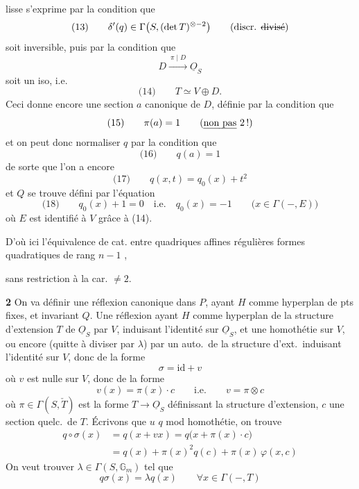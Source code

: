 \documentclass[11pt,a4paper]{article}
\begin{document}
lisse s'exprime par la condition que
\[
  \text{(13)} \qquad \delta'(q) \in \Gamma\bigl(S, (\det T)^{\otimes -2}\bigr)
  \qquad (\text{discr. \struck{divisé}})
\]
soit inversible, puis par la condition que
\[
  D \xrightarrow{\ \pi \mid D\ } \underline{O}_S
\]
soit un iso, i.e.
\[
  \text{(14)} \qquad T \simeq V \oplus D .
\]
Ceci donne encore une section $a$ canonique de $D$, définie par la condition que
\[
  \text{(15)} \qquad \pi(a) = 1 \qquad (\text{\uncertain{non pas} } 2\,!)
\]
et on peut donc normaliser $q$ par la condition que
\[
  \text{(16)} \qquad q(a) = 1
\]
de sorte que l'on a encore
\[
  \text{(17)} \qquad q(x,t) = q_0(x) + t^2
\]
et $Q$ se trouve défini par l'équation
\[
  \text{(18)} \qquad q_0(x) + 1 = 0 \quad \text{i.e.} \quad q_0(x) = -1
  \qquad \bigl(x \in \Gamma(-,E)\bigr)
\]
où $E$ est identifié à $V$ grâce à (14).

D'où ici l'équivalence de cat. entre quadriques affines  régulières
  formes quadratiques  de rang $n-1$
,

sans restriction à la car. $\neq 2$.

\textbf{2} On va définir une réflexion canonique dans $P$, ayant $H$ comme
hyperplan de pts fixes, et invariant $Q$. Une 
réflexion  ayant $H$ comme hyperplan
   \ill{} de la structure d'extension
\struck{\ill{}} $T$ de $\underline{O}_S$ par $V$,  induisant
l'identité sur $\underline{O}_S$, et une homothétie 
sur $V$, ou encore (quitte à diviser par $\lambda$) par un auto.\ de
la structure d'ext.\ induisant l'identité sur $V$, donc de la forme
\[
  \sigma = \mathrm{id} + v
\]
où $v$ est nulle sur $V$, donc de la forme
\[
  v(x) = \pi(x)\cdot c \qquad \text{i.e.} \qquad v = \pi \otimes c
\]
où $\pi \in \Gamma(S, \check{T})$ est la forme $T \to \underline{O}_S$
définissant la structure d'extension, $c$ une section quelc.\ de $T$.
Écrivons que \struck{\ill{}} $u$  $q$ mod
homothétie, on trouve
\[
\begin{aligned}
  q \circ \sigma(x) &= q(x + vx) = q\bigl(x + \pi(x)\cdot c\bigr) \\
  &= q(x) + \pi(x)^2 q(c) + \pi(x)\, \varphi(x,c)
\end{aligned}
\]
On veut trouver $\lambda \in \Gamma(S, \mathbb{G}_m)$ tel que
\[
  q\sigma(x) = \lambda q(x) \qquad \forall x \in \Gamma(-,T)
\]
\end{document}
